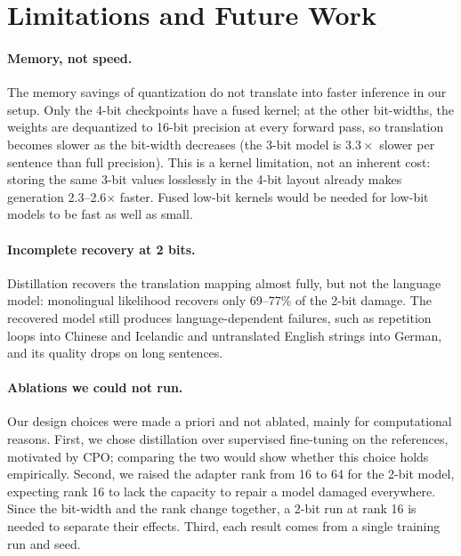 \documentclass[10pt]{article}
\begin{document}
\section*{Limitations and Future Work}

\paragraph{Memory, not speed.} The memory savings of quantization do not
translate into faster inference in our setup. Only the 4-bit checkpoints have a
fused kernel; at the other bit-widths, the weights are dequantized to 16-bit
precision at every forward pass, so translation becomes slower as the bit-width
decreases (the 3-bit model is $3.3\times$ slower per sentence than full
precision). This is a kernel limitation, not an inherent cost: storing the same
3-bit values losslessly in the 4-bit layout already makes generation
2.3--2.6$\times$ faster. Fused low-bit kernels would be needed for low-bit
models to be fast as well as small.

\paragraph{Incomplete recovery at 2 bits.} Distillation recovers the translation
mapping almost fully, but not the language model: monolingual likelihood
recovers only 69--77\% of the 2-bit damage. The recovered model still produces
language-dependent failures, such as repetition loops into Chinese and
Icelandic and untranslated English strings into German, and its quality drops
on long sentences.

\paragraph{Ablations we could not run.} Our design choices were made a priori
and not ablated, mainly for computational reasons. First, we chose distillation
over supervised fine-tuning on the references, motivated by CPO; comparing the
two would show whether this choice holds empirically. Second, we raised the
adapter rank from 16 to 64 for the 2-bit model, expecting rank 16 to lack the
capacity to repair a model damaged everywhere. Since the bit-width and the rank
change together, a 2-bit run at rank 16 is needed to separate their effects.
Third, each result comes from a single training run and seed.
\end{document}
